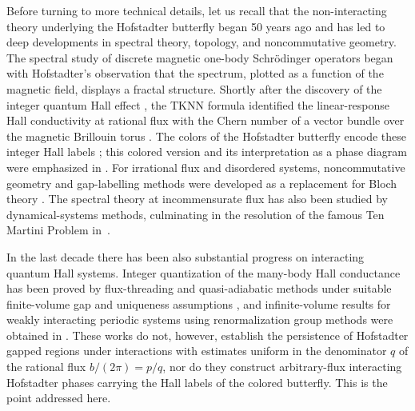 \documentclass[a4paper]{article}
\theoremstyle{plain}
\theoremstyle{definition}
\theoremstyle{remark}
\renewcommand{\(}{\left(}
\renewcommand{\)}{\right)}
\begin{document}
Before turning to more technical details, let us recall that the non-interacting theory underlying the Hofstadter butterfly began 50 years ago and has led to deep developments in spectral theory, topology, and noncommutative geometry.
  The spectral study of discrete magnetic one-body Schr\"odinger operators began with Hofstadter's observation \cite{hofstadter1976energy} that the spectrum, plotted as a function of the magnetic field, displays a fractal structure. Shortly after the discovery of the integer quantum Hall effect \cite{klitzing1980new}, the TKNN formula identified the linear-response Hall conductivity at rational flux with the Chern number of a vector bundle over the magnetic Brillouin torus \cite{TKNN,avron1983homotopy,niu1985quantized}. The colors of the Hofstadter butterfly encode these integer Hall labels \cite{dana1985quantised,osadchy2001hofstadter}; this colored version and its interpretation as a phase diagram were emphasized in \cite{osadchy2001hofstadter}. For irrational flux and disordered systems, noncommutative geometry and gap-labelling methods were developed as a  replacement for Bloch theory \cite{bellissard1992gap,bellissard1994noncommutative}. 
  The spectral theory at incommensurate flux has also been studied by dynamical-systems methods, culminating in the resolution of the famous Ten Martini Problem in~\cite{avila2009ten}.
  
 
In the last decade there has been also substantial progress on interacting quantum Hall systems.
Integer quantization of the many-body Hall conductance has been proved by flux-threading and quasi-adiabatic methods under suitable finite-volume gap and uniqueness assumptions
\cite{hastings2015quantization,bachmann2018quantization}, and  infinite-volume results for weakly interacting periodic systems using renormalization group methods were obtained in \cite{GMP2017}. 
These works do not, however, establish the persistence of Hofstadter gapped regions under interactions with estimates uniform in the denominator $q$ of the rational flux $b/(2\pi)=p/q$, nor do they construct arbitrary-flux interacting Hofstadter phases carrying the Hall labels of the colored butterfly. This is the point addressed here.

 
\end{document}
